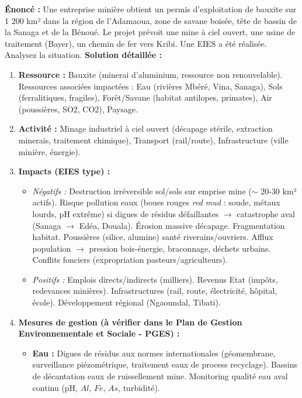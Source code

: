 \documentclass[11pt]{article}
\begin{document}
\begin{exoresolu}
\textbf{Énoncé :} Une entreprise minière obtient un permis d'exploitation de bauxite sur 1 200 km² dans la région de l'Adamaoua, zone de savane boisée, tête de bassin de la Sanaga et de la Bénoué. Le projet prévoit une mine à ciel ouvert, une usine de traitement (Bayer), un chemin de fer vers Kribi. Une EIES a été réalisée. Analysez la situation.
\textbf{Solution détaillée :}
\begin{enumerate}
    \item \textbf{Ressource :} Bauxite (minerai d'aluminium, ressource non renouvelable). Ressources associées impactées : Eau (rivières Mbéré, Vina, Sanaga), Sols (ferralitiques, fragiles), Forêt/Savane (habitat antilopes, primates), Air (poussières, SO2, CO2), Paysage.
    \item \textbf{Activité :} Minage industriel à ciel ouvert (décapage stérile, extraction minerais, traitement chimique), Transport (rail/route), Infrastructure (ville minière, énergie).
    \item \textbf{Impacts (EIES type) :}
        \begin{itemize}
            \item \textit{Négatifs :} Destruction irréversible sol/sols sur emprise mine ($\sim$ 20-30 km² actifs). Risque pollution eaux (boues rouges \emph{red mud} : soude, métaux lourds, pH extrême) si digues de résidus défaillantes $\rightarrow$ catastrophe aval (Sanaga $\rightarrow$ Edéa, Douala). Érosion massive décapage. Fragmentation habitat. Poussières (silice, alumine) santé riverains/ouvriers. Afflux population $\rightarrow$ pression bois-énergie, braconnage, déchets urbains. Conflits fonciers (expropriation pasteurs/agriculteurs).
            \item \textit{Positifs :} Emplois directs/indirects (milliers). Revenus Etat (impôts, redevances minières). Infrastructures (rail, route, électricité, hôpital, école). Développement régional (Ngaoundal, Tibati).
        \end{itemize}
    \item \textbf{Mesures de gestion (à vérifier dans le Plan de Gestion Environnementale et Sociale - PGES) :}
        \begin{itemize}
            \item \textbf{Eau :} Digues de résidus aux normes internationales (géomembrane, surveillance piézométrique, traitement eaux de process recyclage). Bassins de décantation eaux de ruissellement mine. Monitoring qualité eau aval continu (pH, $Al$, $Fe$, $As$, turbidité).

\end{itemize}
\end{enumerate}
\end{exoresolu}
\end{document}
